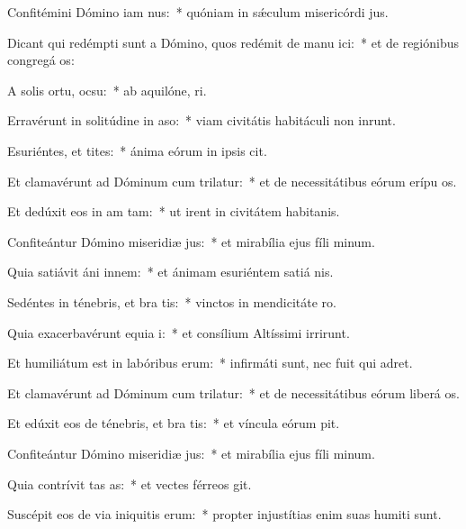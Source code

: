 \item Confitémini Dómino iam nus:~* quóniam in sǽculum misericórdi jus.
\item Dicant qui redémpti sunt a Dómino, quos redémit de manu ici:~* et de regiónibus congregá os:
\item A solis ortu,  ocsu:~* ab aquilóne,  ri.
\item Erravérunt in solitúdine in aso:~* viam civitátis habitáculi non inrunt.
\item Esuriéntes, et tites:~* ánima eórum in ipsis cit.
\item Et clamavérunt ad Dóminum cum trilatur:~* et de necessitátibus eórum erípu os.
\item Et dedúxit eos in am tam:~* ut irent in civitátem habitanis.
\item Confiteántur Dómino miseridiæ jus:~* et mirabília ejus fíli minum.
\item Quia satiávit áni innem:~* et ánimam esuriéntem satiá nis.
\item Sedéntes in ténebris, et bra tis:~* vinctos in mendicitáte  ro.
\item Quia exacerbavérunt equia i:~* et consílium Altíssimi irrirunt.
\item Et humiliátum est in labóribus  erum:~* infirmáti sunt, nec fuit qui adret.
\item Et clamavérunt ad Dóminum cum trilatur:~* et de necessitátibus eórum liberá os.
\item Et edúxit eos de ténebris, et bra tis:~* et víncula eórum pit.
\item Confiteántur Dómino miseridiæ jus:~* et mirabília ejus fíli minum.
\item Quia contrívit tas as:~* et vectes férreos git.
\item Suscépit eos de via iniquitis erum:~* propter injustítias enim suas humiti sunt.
